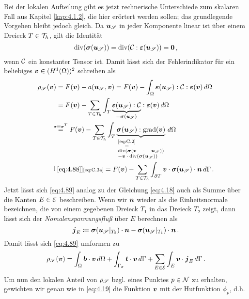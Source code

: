 Bei der lokalen Aufteilung gibt es jetzt rechnerische Unterschiede zum skalaren Fall aus Kapitel \ref{kap:4.1.2}, die hier erörtert werden sollen; das grundlegende Vorgehen bleibt jedoch gleich. Da $\boldsymbol u_{\mathscr S}$ in jeder Komponente linear ist über einem Dreieck $T \in \mathcal T_h$, gilt die Identität \begin{align}\label{eq:4.88}
	\operatorname{div} (\boldsymbol \sigma(\boldsymbol u_{\mathscr S})) = \operatorname{div} (\mathcal C: \boldsymbol {\varepsilon}(\boldsymbol u_{\mathscr S})) = \boldsymbol 0\, ,
\end{align}
wenn $\mathcal C$ ein konstanter Tensor ist. Damit lässt sich der Fehlerindikator für ein beliebiges $\boldsymbol v \in (H^1(\Omega))^2$ schreiben als
\begin{align}\notag
	\rho_{\mscr S}(\bs v) & = F(\bs v) -a(\bs u_{\mscr S},\bs v) = F(\bs v) - \int_{\Omega} \bs\eps(\bs u_{\mscr S}) : \mcal C : \bs \eps(\bs v) \, d\Omega \\
	\notag
	& = F(\bs v) - \sum_{T \in \mcal T_h} \int_T \underbrace{\bs\eps(\bs u_{\mscr S}) : \mcal C}_{=\bs \sigma (\bs u_{\mscr S})} : \bs \eps(\bs v) \, d\Omega \\ 
	\notag
	&\!\!\!\! \stackrel{\scriptsize\bs\sigma = \bs \sigma^T}= F(\bs v) - \sum_{T \in \mcal T_h} \int_T \underbrace{\bs \sigma (\bs u_{\mscr S}) : \grad(\bs v)}_{\parbox{2.4cm}{\scriptsize$\stackrel{\eqref{eq:C.2}}=\div(\bs\sigma(\bs v \cdot \bs u_{\mscr S}))$ $\quad -\bs v \cdot \div(\bs \sigma(\bs u_{\mscr S}))$}} \, d\Omega \\
	\label{eq:4.89}
	& \!\!\!\! \stackrel[\scriptsize \eqref{eq:4.88}]{\scriptsize\eqref{eq:C.3a}}= F(\bs v) - \sum_{T \in \mcal T_h} \int_{\partial T} \bs v \cdot \bs \sigma(\bs u_{\mscr S}) \cdot \bs n \, d\Gamma  \, .
\end{align}
Jetzt lässt sich \eqref{eq:4.89} analog zu der Gleichung \eqref{eq:4.18} auch als Summe über die Kanten $E\in \mathcal E$ beschreiben. Wenn wir $\boldsymbol n$ wieder als die Einheitsnormale bezeichnen, die von einem gegebenen Dreieck $T_1$ in das Dreieck $T_2$ zeigt, dann lässt sich der \textit{Nomalenspannungsfluß} über $E$ berechnen als
\[
	\boldsymbol j_E \coloneqq \boldsymbol\sigma(\boldsymbol u_{\mathscr S}|_{T_2}) \cdot \boldsymbol n - \boldsymbol\sigma(\boldsymbol u_{\mathscr S}|_{T_1})\cdot \boldsymbol n \, .
\]
Damit lässt sich \eqref{eq:4.89} umformen zu
\begin{align}\label{eq:4.90}
	\rho_{\mathscr S} (\boldsymbol v) = \int_\Omega \boldsymbol b \cdot \boldsymbol v \, d\Omega + \int_{\Gamma_\sigma} \boldsymbol t \cdot \boldsymbol v \, d\Gamma + \sum_{E \in \mathcal E} \int_E \boldsymbol v \cdot \boldsymbol j_E \, d\Gamma \, .
\end{align} 
Um nun den lokalen Anteil von $\rho_{\mathscr S}$ bzgl. eines Punktes $p \in \mathcal N$ zu erhalten, gewichten wir genau wie in \eqref{eq:4.19} die Funktion $\boldsymbol v$ mit der Hutfunktion $\phi_p$, d.h.
